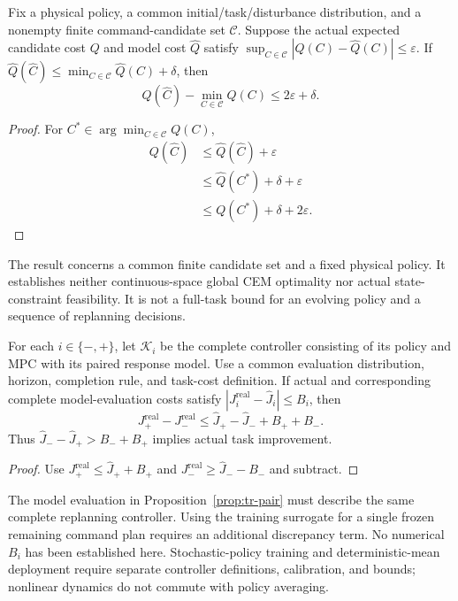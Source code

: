 \begin{proposition}
\label{prop:tr-planning}
Fix a physical policy, a common initial/task/disturbance distribution,
and a nonempty finite command-candidate set $\mathcal C$. Suppose the
actual expected candidate cost $Q$ and model cost $\hat Q$ satisfy
$\sup_{C\in\mathcal C}|Q(C)-\hat Q(C)|\le\varepsilon$. If
$\hat Q(\hat C)\le\min_{C\in\mathcal C}\hat Q(C)+\delta$, then
\begin{equation}
 Q(\hat C)-\min_{C\in\mathcal C}Q(C)\le2\varepsilon+\delta.
 \label{eq:tr-planning}
\end{equation}
\end{proposition}
\begin{proof}
For $C^*\in\arg\min_{C\in\mathcal C}Q(C)$,
\begin{align*}
 Q(\hat C)&\le\hat Q(\hat C)+\varepsilon\\
 &\le\hat Q(C^*)+\delta+\varepsilon\\
 &\le Q(C^*)+\delta+2\varepsilon.
\end{align*}
\end{proof}
The result concerns a common finite candidate set and a fixed physical
policy. It establishes neither continuous-space global CEM optimality
nor actual state-constraint feasibility. It is not a full-task bound for
an evolving policy and a sequence of replanning decisions.

\begin{proposition}
\label{prop:tr-pair}
For each $i\in\{-,+\}$, let $\mathcal K_i$ be the complete controller
consisting of its policy and MPC with its paired response model. Use a
common evaluation distribution, horizon, completion rule, and task-cost
definition. If actual and corresponding complete model-evaluation costs
satisfy $|J_i^{\mathrm{real}}-\hat J_i|\le B_i$, then
\begin{equation}
 J_+^{\mathrm{real}}-J_-^{\mathrm{real}}
 \le \hat J_+-\hat J_-+B_++B_-.
 \label{eq:tr-pair}
\end{equation}
Thus $\hat J_--\hat J_+>B_-+B_+$ implies actual task improvement.
\end{proposition}
\begin{proof}
Use $J_+^{\mathrm{real}}\le\hat J_++B_+$ and
$J_-^{\mathrm{real}}\ge\hat J_--B_-$ and subtract.
\end{proof}
The model evaluation in Proposition~\ref{prop:tr-pair} must describe the
same complete replanning controller. Using the training surrogate for a
single frozen remaining command plan requires an additional discrepancy
term. No numerical $B_i$ has been established here. Stochastic-policy
training and deterministic-mean deployment require separate controller
definitions, calibration, and bounds; nonlinear dynamics do not commute
with policy averaging.

